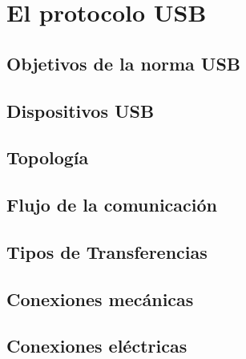 \chapter{El protocolo USB}
	\label{int:usb}
	
		\section{Objetivos de la norma USB}	
		\section{Dispositivos USB}
		\section{Topología}
		\section{Flujo de la comunicación}
		\section{Tipos de Transferencias}
		\section{Conexiones mecánicas}
		\section{Conexiones eléctricas}